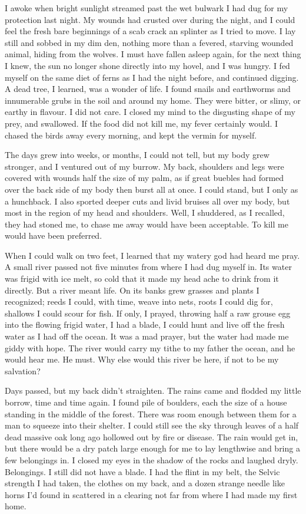 I awoke when bright sunlight streamed past the wet bulwark I had dug for my protection last night. My wounds had crusted over during the night, and I could feel the fresh bare beginnings of a scab crack an splinter as I tried to move. I lay still and sobbed in my dim den, nothing more than a fevered, starving wounded animal, hiding from the wolves. I must have fallen asleep again, for the next thing I knew, the sun no longer shone directly into my hovel, and I was hungry. I fed myself on the same diet of ferns as I had the night before, and continued digging. A dead tree, I learned, was a wonder of life. I found snails and earthworms and innumerable grubs in the soil and around my home. They were bitter, or slimy, or earthy in flavour. I did not care. I closed my mind to the disgusting shape of my prey, and swallowed. If the food did not kill me, my fever certainly would. I chased the birds away every morning, and kept the vermin for myself.

The days grew into weeks, or months, I could not tell, but my body grew stronger, and I ventured out of my burrow. My back, shoulders and legs were covered with wounds half the size of my palm, as if great buebles had formed over the back side of my body then burst all at once. I could stand, but I only as a hunchback.  I also sported deeper cuts and livid bruises all over my body, but most in the region of my head and shoulders. Well, I shuddered, as I recalled, they had stoned me, to chase me away would have been acceptable. To kill me would have been preferred.

When I could walk on two feet, I learned that my watery god had heard me pray. A small river passed not five minutes from where I had dug myself in. Its water was frigid with ice melt, so cold that it made my head ache to drink from it directly. But a river meant life. On its banks grew grasses and plants I recognized; reeds I could, with time, weave into nets, roots I could dig for, shallows I could scour for fish. If only, I prayed, throwing half a raw grouse egg into the flowing frigid water, I had a blade, I could hunt and live off the fresh water as I had off the ocean. It was a mad prayer, but the water had made me giddy with hope. The river would carry my tithe to my father the ocean, and he would hear me. He must. Why else would this river be here, if not to be my salvation?

Days passed, but my back didn't straighten. The rains came and flodded my little borrow, time and time again. I found pile of boulders, each the size of a house standing in the middle of the forest. There was room enough between them for a man to squeeze into their shelter. I could still see the sky through leaves of a half dead massive oak long ago hollowed out by fire or disease. The rain would get in, but there would be a dry patch large enough for me to lay lengthwise and bring a few belongings in. I closed my eyes in the shadow of the rocks and laughed dryly. Belongings. I still did not have a blade. I had the flint in my belt, the Selvic strength I had taken, the clothes on my back, and a dozen strange needle like horns I'd found in scattered in a clearing not far from where I had made my first home.

